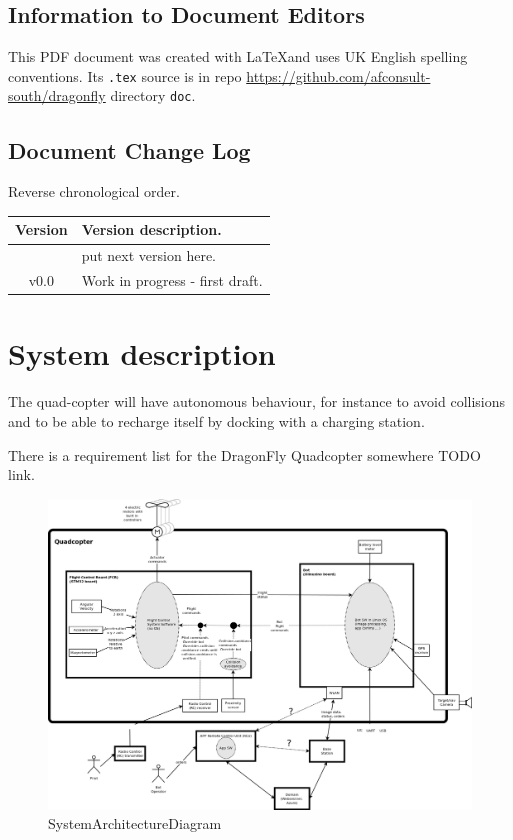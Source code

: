 \documentclass[a4paper]{article}
\begin{document}
\subsection{Information to Document Editors}
\label{sec:editors}
This PDF document was created with \LaTeX and uses UK English spelling conventions. Its \texttt{.tex} source is in repo \url{https://github.com/afconsult-south/dragonfly} directory \texttt{doc}.

\subsection{Document Change Log}
Reverse chronological order.

\begin{center}
\begin{tabular}{ c | l }
  \hline
  Version & Version description. \\ \hline
   & put next version here. \\ \hline
  v0.0 & Work in progress - first draft. \\ \hline
\end{tabular}
\end{center}

\newpage

\section{System description}
The quad-copter will have autonomous behaviour, for instance to avoid collisions and to be able to recharge itself by docking with a charging station.

There is a requirement list for the DragonFly Quadcopter somewhere TODO link.

\begin{figure}[!h]
    \centering
    \includegraphics[width=\textwidth]{images/SystemArchitectureDiagram_DF.png}
    \caption{SystemArchitectureDiagram}
    \label{fig:sysarchdiag}
\end{figure}
\end{document}
